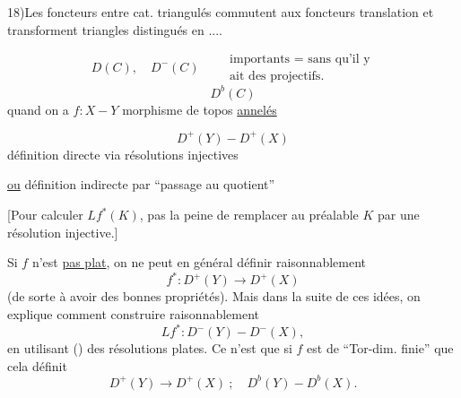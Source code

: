 18)\quad Les foncteurs entre cat. triangulés 
commutent aux foncteurs translation et transforment triangles distingués
en  ....

\[
D(C),\quad D^-(C)\qquad
\begin{gathered}\text{importants = sans qu'il y}\\\text{ait des projectifs.}\end{gathered}
\]
\[
D^b(C)
\]
quand on a $f:X\mathbin{-}Y$ morphisme 
de topos \uline{annelés}

\[
D^+(Y)\mathbin{-}D^+(X)
\]
définition directe via résolutions injectives

\uline{ou} définition indirecte par ``passage au quotient''

[Pour calculer $Lf^*(K)$, pas la peine de remplacer au préalable $K$
par une résolution injective.]

 Si $f$ n'est \uline{pas plat}, on  ne peut
en général définir raisonnablement
\[
f^*:D^+(Y)\longrightarrow D^+(X)
\]
(de sorte à avoir des bonnes propriétés).
Mais dans la suite de ces idées, on explique comment construire raisonnablement
\[
Lf^*:D^-(Y)\mathbin{-}D^-(X),
\]
en utilisant () des résolutions plates.
Ce n'est que si $f$ est de ``Tor-dim. finie'' que cela définit
\[
D^+(Y)\longrightarrow D^+(X)\ ;\quad D^b(Y)\mathbin{-}D^b(X).
\]
